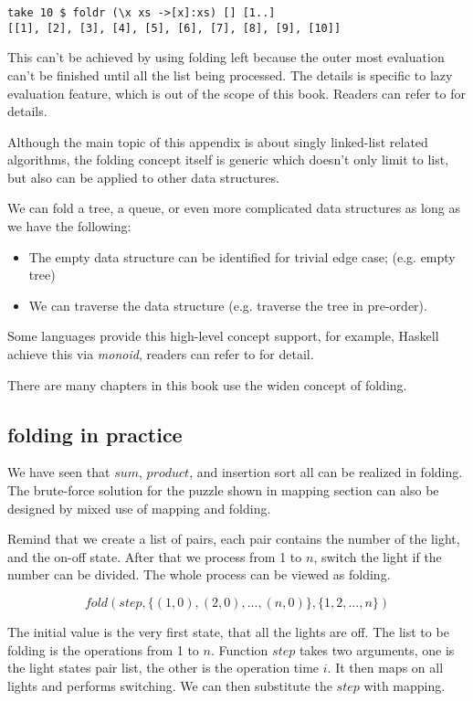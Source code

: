 \documentclass[b5paper]{article}
\begin{document}
\lstset{language=Haskell}
\begin{lstlisting}
take 10 $ foldr (\x xs ->[x]:xs) [] [1..]
[[1], [2], [3], [4], [5], [6], [7], [8], [9], [10]]
\end{lstlisting} %

This can't be achieved by using folding left because the outer most evaluation can't be finished until
all the list being processed. The details is specific to lazy evaluation feature, which is out of the
scope of this book. Readers can refer to \cite{Haskell-wiki} for details.

Although the main topic of this appendix is about singly linked-list related algorithms, the folding
concept itself is generic which doesn't only limit to list, but also can be applied to other data structures.

We can fold a tree, a queue, or even more complicated data structures as long as we have the following:

\begin{itemize}
\item The empty data structure can be identified for trivial edge case; (e.g. empty tree)
\item We can traverse the data structure (e.g. traverse the tree in pre-order).
\end{itemize}

Some languages provide this high-level concept support, for example, Haskell achieve this via
{\em monoid}, readers can refer to \cite{learn-haskell} for detail.

There are many chapters in this book use the widen concept of folding.

\subsection{folding in practice}

We have seen that $sum$, $product$, and insertion sort all can be realized in folding. The
brute-force solution for the puzzle shown in mapping section can also be
designed by mixed use of mapping and folding.

Remind that we create a list of pairs, each pair contains the number of the light, and
the on-off state. After that we process from 1 to $n$, switch the light if the number
can be divided. The whole process can be viewed as folding.

\[
fold(step, \{(1, 0), (2, 0), ..., (n, 0) \}, \{1, 2, ..., n\})
\]

The initial value is the very first state, that all the lights are off. The list to be
folding is the operations from 1 to $n$. Function $step$ takes two arguments, one is
the light states pair list, the other is the operation time $i$. It then maps
on all lights and performs switching. We can then substitute the $step$ with mapping.
\end{document}
